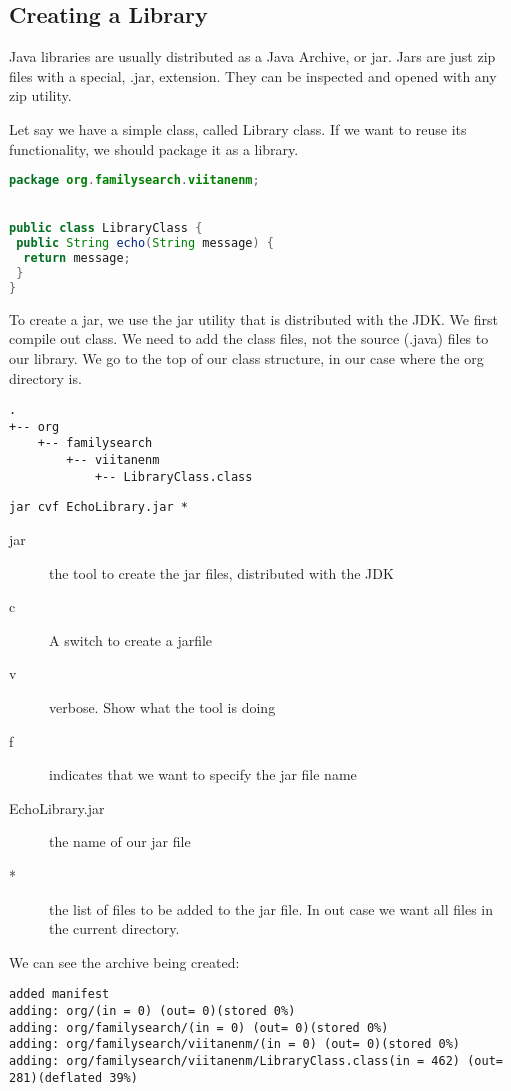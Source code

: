 \subsection{Creating a Library}

Java libraries are usually distributed as a Java Archive, or jar. Jars are just zip files with a special, .jar, extension. They can be inspected and opened with any zip utility.

Let say we have a simple class, called Library class. If we want to reuse its functionality, we should package it as a library. 
\begin{lstlisting}[language=Java]
package org.familysearch.viitanenm;


public class LibraryClass {
 public String echo(String message) {
  return message;
 }
}
\end{lstlisting}

To create a jar, we use the jar utility that is distributed with the JDK. We first compile out class. We need to add the class files, not the source (.java) files to our library. We go to the top of our class structure, in our case where the org directory is.

\begin{lstlisting}
.
+-- org
    +-- familysearch
        +-- viitanenm
            +-- LibraryClass.class
\end{lstlisting}


\begin{lstlisting}
jar cvf EchoLibrary.jar *
\end{lstlisting}

\begin{description}
\item[jar] the tool to create the jar files, distributed with the JDK
\item[c] A switch to create a jarfile
\item[v] verbose. Show what the tool is doing
\item[f] indicates that we want to specify the jar file name
\item[EchoLibrary.jar] the name of our jar file
\item[*] the list of files to be added to the jar file. In out case we want all files in the current directory.
\end{description}

We can see the archive being created:

\begin{lstlisting}
added manifest
adding: org/(in = 0) (out= 0)(stored 0%)
adding: org/familysearch/(in = 0) (out= 0)(stored 0%)
adding: org/familysearch/viitanenm/(in = 0) (out= 0)(stored 0%)
adding: org/familysearch/viitanenm/LibraryClass.class(in = 462) (out= 281)(deflated 39%)
\end{lstlisting}

